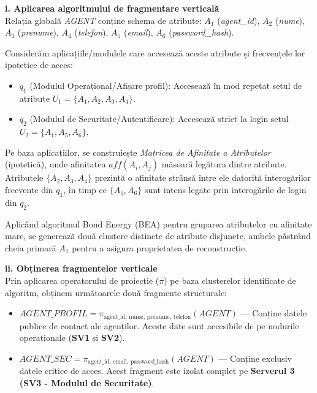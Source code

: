 \textbf{i. Aplicarea algoritmului de fragmentare verticală}\\
Relația globală \textit{AGENT} conține schema de atribute: $A_1$ (\textit{agent\_id}), $A_2$ (\textit{nume}), $A_3$ (\textit{prenume}), $A_4$ (\textit{telefon}), $A_5$ (\textit{email}), $A_6$ (\textit{password\_hash}).

Considerăm aplicațiile/modulele care accesează aceste atribute și frecvențele lor ipotetice de acces:
\begin{itemize}
    \item $q_1$ (Modulul Operațional/Afișare profil): Accesează în mod repetat setul de atribute $U_1 = \{A_1, A_2, A_3, A_4\}$.
    \item $q_2$ (Modulul de Securitate/Autentificare): Accesează strict la login setul $U_2 = \{A_1, A_5, A_6\}$.
\end{itemize}

Pe baza aplicațiilor, se construiește \textit{Matricea de Afinitate a Atributelor} (ipotetică), unde afinitatea $aff(A_i, A_j)$ măsoară legătura dintre atribute. Atributele $\{A_2, A_3, A_4\}$ prezintă o afinitate strânsă între ele datorită interogărilor frecvente din $q_1$, în timp ce $\{A_5, A_6\}$ sunt intens legate prin interogările de login din $q_2$. 

Aplicând algoritmul Bond Energy (BEA) pentru gruparea atributelor cu afinitate mare, se generează două clustere distincte de atribute disjuncte, ambele păstrând cheia primară $A_1$ pentru a asigura proprietatea de reconstrucție.

\textbf{ii. Obținerea fragmentelor verticale}\\
Prin aplicarea operatorului de proiecție ($\pi$) pe baza clusterelor identificate de algoritm, obținem următoarele două fragmente structurale:
\begin{itemize}
    \item $AGENT\_PROFIL = \pi_{\text{agent\_id, nume, prenume, telefon}}(AGENT)$ --- Conține datele publice de contact ale agenților. Aceste date sunt accesibile de pe nodurile operaționale (\textbf{SV1} și \textbf{SV2}).
    \item $AGENT\_SEC = \pi_{\text{agent\_id, email, password\_hash}}(AGENT)$ --- Conține exclusiv datele critice de acces. Acest fragment este izolat complet pe \textbf{Serverul 3 (SV3 - Modulul de Securitate)}.
\end{itemize}